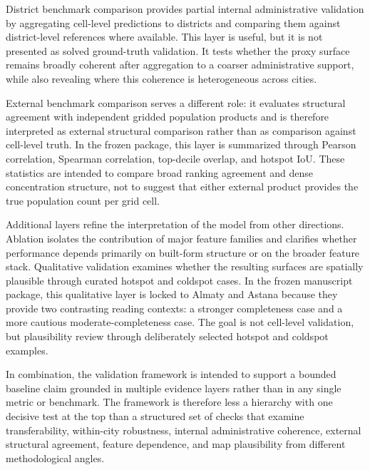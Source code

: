 District benchmark comparison provides partial internal administrative validation by aggregating cell-level predictions to districts and comparing them against district-level references where available. This layer is useful, but it is not presented as solved ground-truth validation. It tests whether the proxy surface remains broadly coherent after aggregation to a coarser administrative support, while also revealing where this coherence is heterogeneous across cities.

External benchmark comparison serves a different role: it evaluates structural agreement with independent gridded population products and is therefore interpreted as external structural comparison rather than as comparison against cell-level truth. In the frozen package, this layer is summarized through Pearson correlation, Spearman correlation, top-decile overlap, and hotspot IoU. These statistics are intended to compare broad ranking agreement and dense concentration structure, not to suggest that either external product provides the true population count per grid cell.

Additional layers refine the interpretation of the model from other directions. Ablation isolates the contribution of major feature families and clarifies whether performance depends primarily on built-form structure or on the broader feature stack. Qualitative validation examines whether the resulting surfaces are spatially plausible through curated hotspot and coldspot cases. In the frozen manuscript package, this qualitative layer is locked to Almaty and Astana because they provide two contrasting reading contexts: a stronger completeness case and a more cautious moderate-completeness case. The goal is not cell-level validation, but plausibility review through deliberately selected hotspot and coldspot examples.

In combination, the validation framework is intended to support a bounded baseline claim grounded in multiple evidence layers rather than in any single metric or benchmark. The framework is therefore less a hierarchy with one decisive test at the top than a structured set of checks that examine transferability, within-city robustness, internal administrative coherence, external structural agreement, feature dependence, and map plausibility from different methodological angles.
